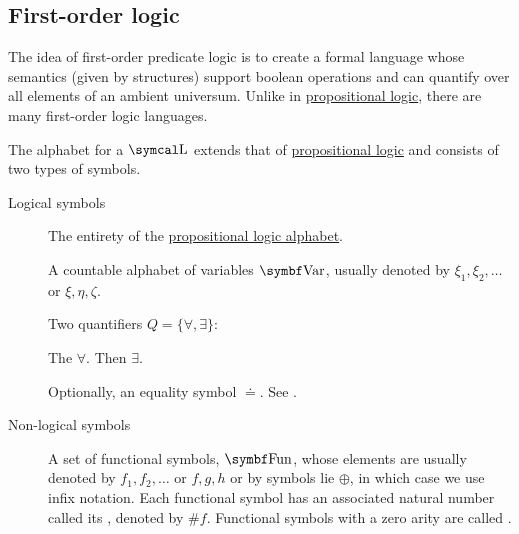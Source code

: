 \subsection{First-order logic}\label{subsec:first_order_logic}

\begin{definition}\label{def:first_order_logic_alphabet}
  The idea of first-order predicate logic is to create a formal language whose semantics (given by structures) support boolean operations and can quantify over all elements of an ambient universum. Unlike in \hyperref[subsec:propositional_logic]{propositional logic}, there are many first-order logic languages.

  The alphabet for a  \( \CL \) extends that of \hyperref[subsec:propositional_logic]{propositional logic} and consists of two types of symbols.

  \begin{description}
    \item[Logical symbols]\mbox{}
    \begin{DefEnum}[series=def:first_order_logic_alphabet]
       The entirety of the \hyperref[subsec:propositional_logic]{propositional logic alphabet}.

       A countable alphabet of variables \( \Bold{Var} \), usually denoted by \( \xi_1, \xi_2, \ldots \) or \( \xi, \eta, \zeta \).

       Two quantifiers \( Q = \{ \forall, \exists \} \):
      \begin{DefEnum}
         The  \( \forall \).
         Then  \( \exists \).
      \end{DefEnum}

       Optionally, an equality symbol \( \doteq \). See .
    \end{DefEnum}

    \item[Non-logical symbols]\mbox{}
    \begin{DefEnum}[resume=def:first_order_logic_alphabet]
       A set of functional symbols, \( \Bold{Fun} \), whose elements are usually denoted by \( f_1, f_2, \ldots \) or \( f, g, h \) or by symbols lie \( \oplus \), in which case we use infix notation. Each functional symbol has an associated natural number called its , denoted by \( \# f \). Functional symbols with a zero arity are called .


\end{DefEnum}
\end{description}
\end{definition}
